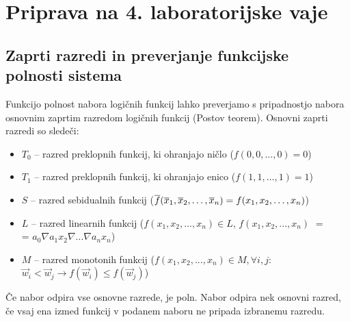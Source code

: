 \chapter{Priprava na 4. laboratorijske vaje}

\section{Zaprti razredi in preverjanje funkcijske polnosti sistema}

Funkcijo polnost nabora logičnih funkcij lahko preverjamo s pripadnostjo nabora osnovnim zaprtim razredom logičnih funkcij (Postov teorem). Osnovni zaprti razredi so sledeči:
\begin{itemize}
\item $T_0$ -- razred preklopnih funkcij, ki ohranjajo ničlo ($f(0,0,\ldots,0) = 0$)
\item $T_1$ -- razred preklopnih funkcij, ki ohranjajo enico ($f(1,1,\ldots,1) = 1$)
\item $S$ -- razred sebidualnih funkcij ($\overline f (\overline x_1,\overline x_2,\ldots,\overline x_n) = f(x_1,x_2,\ldots,x_n)$)
\item $L$ -- razred linearnih funkcij ($f(x_1, x_2,...,x_n) \in L$, $f(x_1,x_2,...,x_n)$ $=$ \\= $a_0 \nabla a_1 x_2 \nabla ... \nabla a_n x_n$)
\item $M$ -- razred monotonih funkcij ($f(x_1, x_2,...,x_n) \in M, \forall i,j: $ \\$\vec{w}_i < \vec{w}_j \rightarrow f(\vec{w}_i) \leq f(\vec{w}_j)$)
\end{itemize}
Če nabor odpira vse osnovne razrede, je poln. Nabor odpira nek osnovni razred, če vsaj ena izmed funkcij v podanem naboru ne pripada izbranemu razredu. 



